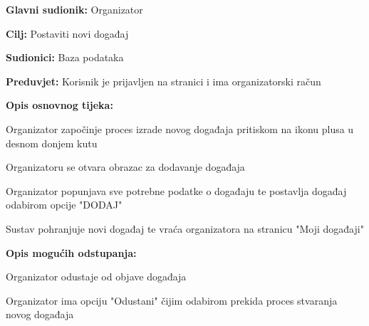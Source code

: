 					\noindent {}
\begin{packed_item}
	\item \textbf{Glavni sudionik:} Organizator
	\item  \textbf{Cilj:} Postaviti novi događaj
	\item  \textbf{Sudionici:} Baza podataka
	\item  \textbf{Preduvjet:} Korisnik je prijavljen na stranici i ima organizatorski račun
	\item  \textbf{Opis osnovnog tijeka:}
	
	\item[] \begin{packed_enum}
		
		\item Organizator započinje proces izrade novog događaja pritiskom na ikonu plusa u desnom donjem kutu
		\item Organizatoru se otvara obrazac za dodavanje događaja
		\item Organizator popunjava sve potrebne podatke o događaju te postavlja događaj odabirom opcije "DODAJ"
		\item Sustav pohranjuje novi događaj te vraća organizatora na stranicu "Moji događaji"
	\end{packed_enum}
	
	\item  \textbf{Opis mogućih odstupanja:}
	
	\item[] \begin{packed_item}
		
		\item[4.a] Organizator odustaje od objave događaja
		\item[] \begin{packed_enum}
			
			\item Organizator ima opciju "Odustani" čijim odabirom prekida proces stvaranja novog događaja
			
		\end{packed_enum}
	\end{packed_item}
\end{packed_item}

